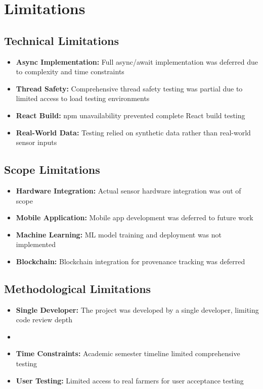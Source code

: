 \section{Limitations}

\subsection{Technical Limitations}

\begin{itemize}
    \item \textbf{Async Implementation:} Full async/await implementation was deferred due to complexity and time constraints
    \item \textbf{Thread Safety:} Comprehensive thread safety testing was partial due to limited access to load testing environments
    \item \textbf{React Build:} npm unavailability prevented complete React build testing
    \item \textbf{Real-World Data:} Testing relied on synthetic data rather than real-world sensor inputs
\end{itemize}

\subsection{Scope Limitations}

\begin{itemize}
    \item \textbf{Hardware Integration:} Actual sensor hardware integration was out of scope
    \item \textbf{Mobile Application:} Mobile app development was deferred to future work
    \item \textbf{Machine Learning:} ML model training and deployment was not implemented
    \item \textbf{Blockchain:} Blockchain integration for provenance tracking was deferred
\end{itemize}

\subsection{Methodological Limitations}

\begin{itemize}
    \item \textbf{Single Developer:} The project was developed by a single developer, limiting code review depth
    \item \item \textbf{Time Constraints:} Academic semester timeline limited comprehensive testing
    \item \textbf{User Testing:} Limited access to real farmers for user acceptance testing
\end{itemize}

